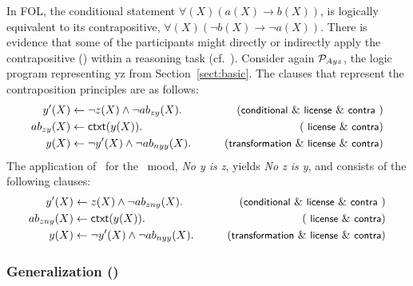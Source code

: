 \documentclass[12pt]{article}
\begin{document}
In FOL, the conditional statement $\forall (X) (a(X) \rightarrow b(X))$, is logically
equivalent to its contrapositive, $\forall (X) (\neg b(X) \rightarrow \neg a(X))$.
There is
evidence that some of the participants might directly or indirectly 
apply the contrapositive (\contraposition) within a reasoning task (cf.~\cite{rips:1994,mentallogic:1994}).
Consider again ${\cal P}_{Ayz}$, the logic program representing \MA yz
from Section~\ref{sect:basic}. The clauses that represent the contraposition principles are as follows:
\begin{align}
y'(X) & \leftarrow  \neg z(X) \wedge \neg \Ab_{zy}(X). & \tag{\conditionals\ \&\ \licenses\ \&\ \contraposition\ } \\
\Ab_{zy}(X) & \leftarrow \cxt(y(X)). & \tag{ \licenses\ \&\ \contraposition}\\
y(X) & \leftarrow  \neg y'(X) \wedge \neg \Ab_{nyy}(X). & \tag{\transformation\ \&\ \licenses\ \&\ \contraposition} 
\end{align}
The application of \contraposition\ for the \ME\ mood,
\textit{No y is z}, yields \textit{No z is y}, and consists of the following clauses:
\begin{align}
y'(X) & \leftarrow z(X) \wedge \neg \Ab_{zny}(X). & \tag{\conditionals\ \&\ \licenses\ \&\ \contraposition\ } \\
\Ab_{zny}(X) & \leftarrow \cxt(y(X)). &\tag{ \licenses\ \&\ \contraposition}\\
y(X) & \leftarrow \neg y'(X) \wedge \neg \Ab_{nyy}(X). & \tag{\transformation\ \&\ \licenses\ \&\ \contraposition} 
\end{align}




\subsubsection{Generalization (\negFailure)}  %
\end{document}
